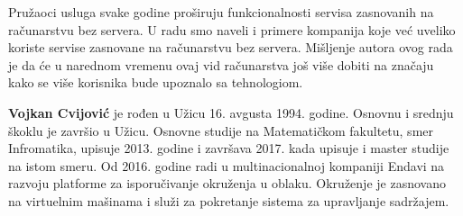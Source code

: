 \documentclass[12pt,oneside]{memoir}
\begin{document}
Pružaoci usluga svake godine proširuju funkcionalnosti servisa zasnovanih na računarstvu bez servera. U radu smo naveli i primere kompanija koje već uveliko koriste servise zasnovane na računarstvu bez servera. Mišljenje autora ovog rada je da će u narednom vremenu ovaj vid računarstva još više dobiti na značaju kako se više korisnika bude upoznalo sa tehnologiom.

\literatura

\backmatter

\begin{biografija}
  \textbf{Vojkan Cvijović} je rođen u Užicu 16. avgusta 1994. godine. Osnovnu i srednju škoklu je završio u Užicu. Osnovne studije na Matematičkom fakultetu, smer Infromatika, upisuje 2013. godine i završava 2017. kada upisuje i master studije na istom smeru. Od 2016. godine radi u multinacionalnoj kompaniji Endavi na razvoju platforme za isporučivanje okruženja u oblaku. Okruženje je zasnovano na virtuelnim mašinama i služi za pokretanje sistema za upravljanje sadržajem.
\end{biografija}
\end{document}
